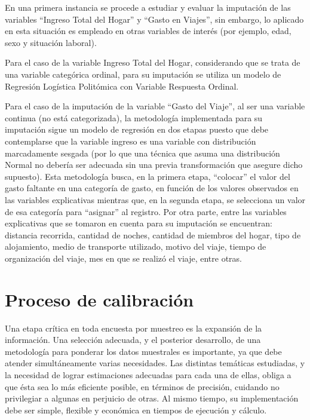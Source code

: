 \documentclass[
  openany]{book}
\begin{document}
En una primera instancia se procede a estudiar y evaluar la imputación de las variables ``Ingreso Total del Hogar'' y ``Gasto en Viajes'', sin embargo, lo aplicado en esta situación es empleado en otras variables de interés (por ejemplo, edad, sexo y situación laboral).

Para el caso de la variable Ingreso Total del Hogar, considerando que se trata de una variable categórica ordinal, para su imputación se utiliza un modelo de Regresión Logística Politómica con Variable Respuesta Ordinal.

Para el caso de la imputación de la variable ``Gasto del Viaje'', al ser una variable continua (no está categorizada), la metodología implementada para su imputación sigue un modelo de regresión en dos etapas puesto que debe contemplarse que la variable ingreso es una variable con distribución marcadamente sesgada (por lo que una técnica que asuma una distribución Normal no debería ser adecuada sin una previa transformación que asegure dicho supuesto). Esta metodología busca, en la primera etapa, ``colocar'' el valor del gasto faltante en una categoría de gasto, en función de los valores observados en las variables explicativas mientras que, en la segunda etapa, se selecciona un valor de esa categoría para ``asignar'' al registro. Por otra parte, entre las variables explicativas que se tomaron en cuenta para su imputación se encuentran: distancia recorrida, cantidad de noches, cantidad de miembros del hogar, tipo de alojamiento, medio de transporte utilizado, motivo del viaje, tiempo de organización del viaje, mes en que se realizó el viaje, entre otras.

\hypertarget{proceso-de-calibraciuxf3n}{%
\section{Proceso de calibración}\label{proceso-de-calibraciuxf3n}}

Una etapa crítica en toda encuesta por muestreo es la expansión de la información. Una selección adecuada, y el posterior desarrollo, de una metodología para ponderar los datos muestrales es importante, ya que debe atender simultáneamente varias necesidades. Las distintas temáticas estudiadas, y la necesidad de lograr estimaciones adecuadas para cada una de ellas, obliga a que ésta sea lo más eficiente posible, en términos de precisión, cuidando no privilegiar a algunas en perjuicio de otras. Al mismo tiempo, su implementación debe ser simple, flexible y económica en tiempos de ejecución y cálculo.
\end{document}

